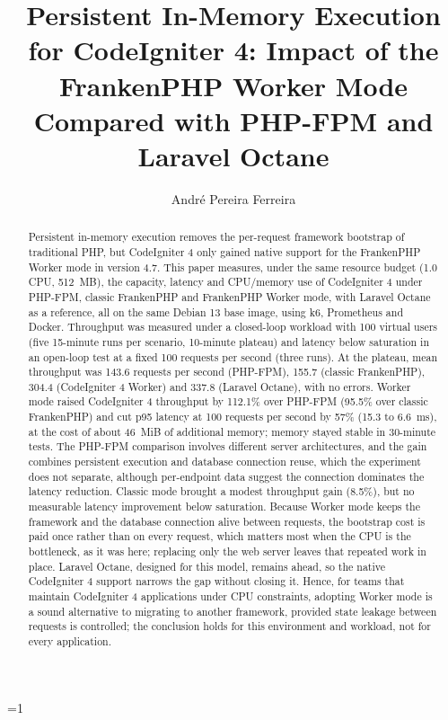 \documentclass[sigconf, nonacm, screen, language=portuguese, language=spanish, language={main=english}]{acmart}
\makeatletter
\newcounter{cotbNumAuthors}
\let\cotb@originalauthor\author
\renewcommand{\author}[1]{%
  \stepcounter{cotbNumAuthors}%
  \ifnum\value{cotbNumAuthors}=1
    \gdef\cotbFirstAuthorName{#1}%
  \fi
  \cotb@originalauthor{#1}%
}
\makeatother
\begin{document}
\title{Persistent In-Memory Execution for CodeIgniter 4: Impact of the FrankenPHP Worker Mode Compared with PHP-FPM and Laravel Octane}


\author{André Pereira Ferreira}


\begin{abstract}
Persistent in-memory execution removes the per-request framework bootstrap of traditional PHP, but CodeIgniter 4 only gained native support for the FrankenPHP Worker mode in version 4.7. This paper measures, under the same resource budget (1.0 CPU, 512~MB), the capacity, latency and CPU/memory use of CodeIgniter 4 under PHP-FPM, classic FrankenPHP and FrankenPHP Worker mode, with Laravel Octane as a reference, all on the same Debian 13 base image, using k6, Prometheus and Docker. Throughput was measured under a closed-loop workload with 100 virtual users (five 15-minute runs per scenario, 10-minute plateau) and latency below saturation in an open-loop test at a fixed 100 requests per second (three runs). At the plateau, mean throughput was 143.6 requests per second (PHP-FPM), 155.7 (classic FrankenPHP), 304.4 (CodeIgniter 4 Worker) and 337.8 (Laravel Octane), with no errors. Worker mode raised CodeIgniter 4 throughput by 112.1\% over PHP-FPM (95.5\% over classic FrankenPHP) and cut p95 latency at 100 requests per second by 57\% (15.3 to 6.6~ms), at the cost of about 46~MiB of additional memory; memory stayed stable in 30-minute tests. The PHP-FPM comparison involves different server architectures, and the gain combines persistent execution and database connection reuse, which the experiment does not separate, although per-endpoint data suggest the connection dominates the latency reduction. Classic mode brought a modest throughput gain (8.5\%), but no measurable latency improvement below saturation. Because Worker mode keeps the framework and the database connection alive between requests, the bootstrap cost is paid once rather than on every request, which matters most when the CPU is the bottleneck, as it was here; replacing only the web server leaves that repeated work in place. Laravel Octane, designed for this model, remains ahead, so the native CodeIgniter 4 support narrows the gap without closing it. Hence, for teams that maintain CodeIgniter 4 applications under CPU constraints, adopting Worker mode is a sound alternative to migrating to another framework, provided state leakage between requests is controlled; the conclusion holds for this environment and workload, not for every application.
\end{abstract}
\end{document}
